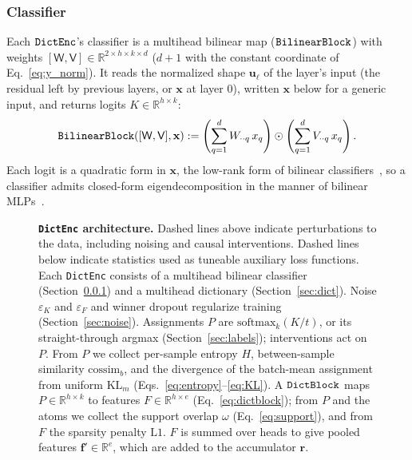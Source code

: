 \subsubsection{Classifier}
\label{sec:bilinear}
Each $\mathop{\mathtt{DictEnc}}\limits$'s classifier is a multihead bilinear map
($\mathop{\mathtt{BilinearBlock}}\limits$) with weights
$[\mathsf{W}, \mathsf{V}] \in \mathbb{R}^{2 \times h \times k \times d}$
($d+1$ with the constant coordinate of Eq.~\eqref{eq:y_norm}). It
reads the normalized shape $\mathbf{u}_\ell$ of the layer's input (the
residual left by previous layers, or $\mathbf{x}$ at layer 0), written
$\mathbf{x}$ below for a generic input, and returns logits
$K \in \mathbb{R}^{h \times k}$:
\begin{equation}
	\mathop{\mathtt{BilinearBlock}}\limits([\mathsf{W},\mathsf{V}],\mathbf{x}) :=
	\left(\sum^{d}_{q=1}W_{\cdot\cdot q}\,x_q\right)
	 \odot \left(\sum^{d}_{q=1}V_{\cdot\cdot q}\,x_q\right).
	 \label{eq:bilinearblock}
\end{equation}
Each logit is a quadratic form in $\mathbf{x}$, the low-rank form of
bilinear classifiers~\cite{pirsiavash2009,kim2017}, so a classifier admits
closed-form eigendecomposition in the manner of bilinear
MLPs~\cite{pearce2025}.

\begin{figure}[tp]
\centering
\resizebox{\linewidth}{!}{}
\caption[\texttt{DictEnc} architecture]{\textbf{\texttt{DictEnc} architecture.}
	Dashed lines above indicate perturbations to the data,
	including noising and causal interventions.
	Dashed lines below indicate statistics used as tuneable auxiliary loss
	functions. Each \texttt{DictEnc} consists of a multihead bilinear
	classifier (Section~\ref{sec:bilinear}) and a multihead dictionary
	(Section~\ref{sec:dict}). Noise $\varepsilon_K$ and $\varepsilon_F$ and winner
	dropout regularize training (Section~\ref{sec:noise}).
	Assignments $P$ are $\mathrm{softmax}_{k}(K/t)$, or its straight-through
	argmax (Section~\ref{sec:labels}); interventions act on $P$. From $P$ we
	collect per-sample entropy $H$, between-sample similarity
	$\mathrm{cossim}_b$, and the divergence of the batch-mean assignment
	from uniform $\mathrm{KL}_m$
	(Eqs.~\eqref{eq:entropy}--\eqref{eq:KL}). A $\mathop{\mathtt{DictBlock}}\limits$ maps
	$P \in \mathbb{R}^{h \times k}$ to features
	$F \in \mathbb{R}^{h \times e}$ (Eq.~\eqref{eq:dictblock}); from $P$
	and the atoms we collect the support overlap $\omega$
	(Eq.~\eqref{eq:support}), and from $F$ the sparsity penalty
	$\mathrm{L1}$. $F$ is summed over heads to give pooled
	features $\mathbf{f}' \in \mathbb{R}^{e}$, which are added to the
	accumulator $\mathbf{r}$.
}
\label{fig:dictenc}
\end{figure}

